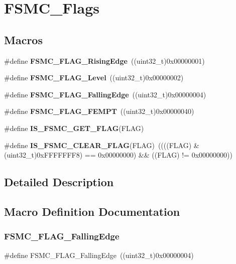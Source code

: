 \section{F\+S\+M\+C\+\_\+\+Flags}
\label{group__FSMC__Flags}
\subsection*{Macros}
\begin{DoxyCompactItemize}
\item 
\#define \textbf{ F\+S\+M\+C\+\_\+\+F\+L\+A\+G\+\_\+\+Rising\+Edge}~((uint32\+\_\+t)0x00000001)
\item 
\#define \textbf{ F\+S\+M\+C\+\_\+\+F\+L\+A\+G\+\_\+\+Level}~((uint32\+\_\+t)0x00000002)
\item 
\#define \textbf{ F\+S\+M\+C\+\_\+\+F\+L\+A\+G\+\_\+\+Falling\+Edge}~((uint32\+\_\+t)0x00000004)
\item 
\#define \textbf{ F\+S\+M\+C\+\_\+\+F\+L\+A\+G\+\_\+\+F\+E\+M\+PT}~((uint32\+\_\+t)0x00000040)
\item 
\#define \textbf{ I\+S\+\_\+\+F\+S\+M\+C\+\_\+\+G\+E\+T\+\_\+\+F\+L\+AG}(F\+L\+AG)
\item 
\#define \textbf{ I\+S\+\_\+\+F\+S\+M\+C\+\_\+\+C\+L\+E\+A\+R\+\_\+\+F\+L\+AG}(F\+L\+AG)~((((F\+L\+AG) \& (uint32\+\_\+t)0x\+F\+F\+F\+F\+F\+F\+F8) == 0x00000000) \&\& ((\+F\+L\+A\+G) != 0x00000000))
\end{DoxyCompactItemize}


\subsection{Detailed Description}


\subsection{Macro Definition Documentation}
\mbox{\label{group__FSMC__Flags_gaaaa85bce06ed962874686ad7af0f0cb7}} 
\subsubsection{F\+S\+M\+C\+\_\+\+F\+L\+A\+G\+\_\+\+Falling\+Edge}
{\footnotesize\ttfamily \#define F\+S\+M\+C\+\_\+\+F\+L\+A\+G\+\_\+\+Falling\+Edge~((uint32\+\_\+t)0x00000004)}



